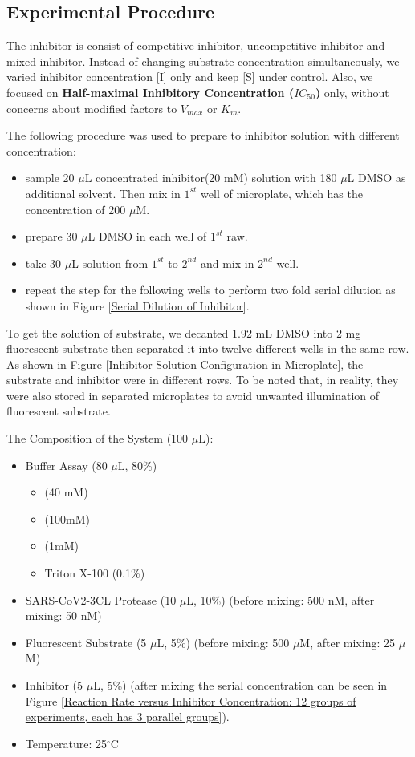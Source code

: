 \documentclass{report}
\begin{document}
\subsection{Experimental Procedure}
The inhibitor is consist of competitive inhibitor, uncompetitive inhibitor and mixed inhibitor.
Instead of changing substrate concentration simultaneously, we varied inhibitor concentration [I] only and keep [S] under control.
Also, we focused on \textbf{Half-maximal Inhibitory Concentration ($IC_{50}$)} only, without concerns about modified factors to $V_{max}$ or $K_m$.

The following procedure was used to prepare to inhibitor solution with different concentration:

\begin{itemize}
    \item sample 20 $\mu$L concentrated inhibitor(20 mM) solution with 180 $\mu$L DMSO as additional solvent. Then mix in $1^{st}$ well of microplate, which has the concentration of 200 $\mu$M.
    \item prepare 30 $\mu$L DMSO in each well of $1^{st}$ raw.
    \item take 30 $\mu$L solution from $1^{st}$ to $2^{nd}$ and mix in $2^{nd}$ well.
    \item repeat the step for the following wells to perform two fold serial dilution as shown in Figure \ref{Serial Dilution of Inhibitor}.
\end{itemize}

To get the solution of substrate, we decanted 1.92 mL DMSO into 2 mg fluorescent substrate then separated it into twelve different wells in the same row.
As shown in Figure \ref{Inhibitor Solution Configuration in Microplate}, the substrate and inhibitor were in different rows.
To be noted that, in reality, they were also stored in separated microplates to avoid unwanted illumination of fluorescent substrate.

The Composition of the System (100 $\mu$L):
\begin{itemize}
    \item Buffer Assay (80 $\mu$L, 80\%)
    \begin{itemize}
        \item {} (40 mM)
        \item {} (100mM)
        \item {} (1mM)
        \item Triton X-100 (0.1\%)
    \end{itemize}
    \item SARS-CoV2-3CL Protease (10 $\mu$L, 10\%) (before mixing: 500 nM, after mixing: 50 nM)
    \item Fluorescent Substrate (5 $\mu$L, 5\%) (before mixing: 500 $\mu$M, after mixing: 25 $\mu$M)
    \item Inhibitor (5 $\mu$L, 5\%) (after mixing the serial concentration can be seen in Figure \ref{Reaction Rate versus Inhibitor Concentration: 12 groups of experiments, each has 3 parallel groups}).
    \item Temperature: 25$^\circ$C
\end{itemize}
\end{document}
